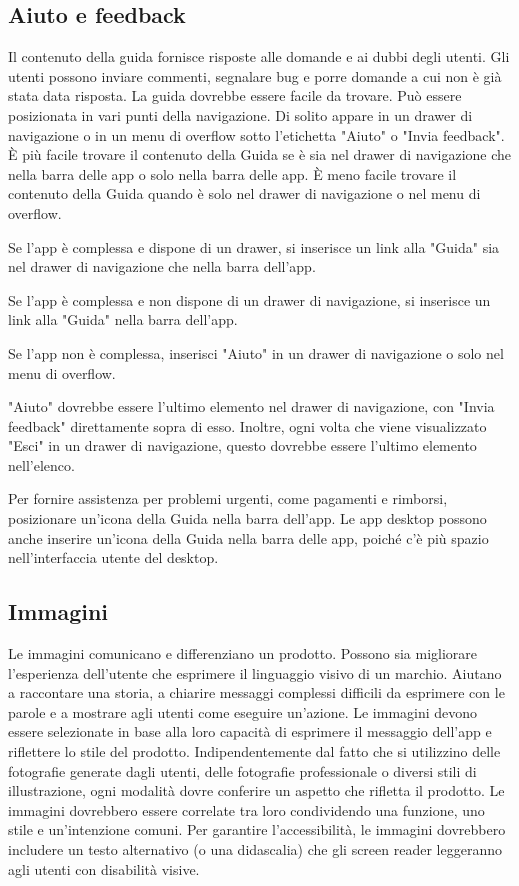 \documentclass[12pt, a4paper]{report}
\begin{document}
	\subsection{Aiuto e feedback}
	Il contenuto della guida fornisce risposte alle domande e ai dubbi degli utenti. Gli utenti possono inviare commenti, segnalare bug e porre domande a cui non è già stata data risposta. La guida dovrebbe essere facile da trovare. Può essere posizionata in vari punti della navigazione.
	Di solito appare in un drawer di navigazione o in un menu di overflow sotto l'etichetta "Aiuto" o "Invia feedback". È più facile trovare il contenuto della Guida se è sia nel drawer di navigazione che nella barra delle app o solo nella barra delle app. È meno facile trovare il contenuto della Guida quando è solo nel drawer di navigazione o nel menu di overflow.

	Se l’app è complessa e dispone di un drawer, si inserisce un link alla "Guida" sia nel drawer di navigazione che nella barra dell'app.

	Se l’app è complessa e non dispone di un drawer di navigazione, si  inserisce un link alla "Guida" nella barra dell'app.

	Se l’app non è complessa, inserisci "Aiuto" in un drawer di navigazione o solo nel menu di overflow.

	"Aiuto" dovrebbe essere l'ultimo elemento nel drawer di navigazione, con "Invia feedback" direttamente sopra di esso. Inoltre, ogni volta che viene visualizzato "Esci" in un drawer di navigazione, questo dovrebbe essere l'ultimo elemento nell'elenco.

	Per fornire assistenza per problemi urgenti, come pagamenti e rimborsi, posizionare un'icona della Guida nella barra dell'app. Le app desktop possono anche inserire un'icona della Guida nella barra delle app, poiché c'è più spazio nell'interfaccia utente del desktop.

	\subsection{Immagini}
	Le immagini comunicano e differenziano un prodotto. Possono sia migliorare l'esperienza dell'utente che esprimere il linguaggio visivo di un marchio. Aiutano a raccontare una storia, a chiarire messaggi complessi difficili da esprimere con le parole e a mostrare
	agli utenti come eseguire un'azione. Le immagini devono essere selezionate in base alla loro capacità di esprimere il messaggio dell’app e riflettere lo stile del prodotto. Indipendentemente dal fatto che si utilizzino delle fotografie generate dagli utenti, delle
	fotografie professionale o diversi stili di illustrazione, ogni modalità dovre conferire un aspetto che rifletta il  prodotto. Le immagini dovrebbero essere correlate tra loro condividendo una funzione, uno stile e un'intenzione comuni. Per garantire l'accessibilità, le immagini dovrebbero includere un testo alternativo (o una didascalia) che gli screen reader leggeranno agli utenti con disabilità visive.
\end{document}
